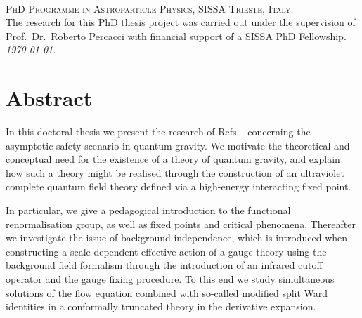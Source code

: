 \documentclass[11pt]{book}
\numberwithin{equation}{chapter}
\begin{document}
\frontmatter %



\newpage
~\vfill
\thispagestyle{empty}

\noindent \textsc{PhD Programme in Astroparticle Physics, SISSA Trieste, Italy.}\\

\noindent The research for this PhD thesis project was carried out
under the supervision of Prof.~Dr.~Roberto Percacci with financial support
of a SISSA PhD Fellowship.\\

\noindent \textit{\monthyeardate\today.} %



{}
\chapter*{Abstract}

\vfill
In this doctoral thesis we present the research of Refs.~\cite{
  Labus:2015ska, Dona:2015tnf, Labus:2016lkh, Eichhorn:2017aaa
} concerning the asymptotic safety scenario in quantum gravity.
We motivate the theoretical and conceptual need for the existence
of a theory of quantum gravity, and explain how such a theory might be
realised through the construction of an ultraviolet complete
quantum field theory defined via a high-energy interacting fixed point.

In particular, we give a pedagogical introduction to the functional
renormalisation group, as well as fixed points and critical phenomena.
Thereafter we investigate the issue of background independence, which
is introduced when constructing a scale-dependent effective action
of a gauge theory using the background field formalism
through the introduction of an infrared cutoff
operator and the gauge fixing procedure.
To this end we study simultaneous solutions of the flow equation
combined with so-called modified split Ward identities in a conformally
truncated theory in the derivative expansion.
\end{document}
